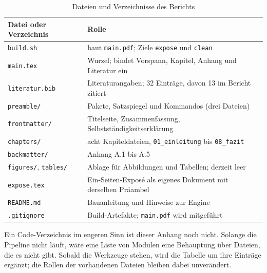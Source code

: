 \begin{table}[ht]
  \centering
  \caption{Dateien und Verzeichnisse des Berichts}
  \label{tab:dateien}
  \small
  \begin{tabular}{@{}>{\raggedright\arraybackslash}p{}>{\raggedright\arraybackslash}p{}@{}}
    \toprule
    Datei oder Verzeichnis & Rolle \\
    \midrule
    \texttt{build.sh} & baut \texttt{main.pdf}; Ziele \texttt{expose} und \texttt{clean} \\
    \texttt{main.tex} & Wurzel; bindet Vorspann, Kapitel, Anhang und Literatur ein \\
    \texttt{literatur.bib} & Literaturangaben; 32 Einträge, davon 13 im Bericht zitiert \\
    \texttt{preamble/} & Pakete, Satzspiegel und Kommandos (drei Dateien) \\
    \texttt{frontmatter/} & Titelseite, Zusammenfassung, Selbstständigkeitserklärung \\
    \texttt{chapters/} & acht Kapiteldateien, \texttt{01\_einleitung} bis \texttt{08\_fazit} \\
    \texttt{backmatter/} & Anhang A.1 bis A.5 \\
    \texttt{figures/}, \texttt{tables/} & Ablage für Abbildungen und Tabellen; derzeit leer \\
    \texttt{expose.tex} & Ein-Seiten-Exposé als eigenes Dokument mit derselben Präambel \\
    \texttt{README.md} & Bauanleitung und Hinweise zur Engine \\
    \texttt{.gitignore} & Build-Artefakte; \texttt{main.pdf} wird mitgeführt \\
    \bottomrule
  \end{tabular}
\end{table}

Ein Code-Verzeichnis im engeren Sinn ist dieser Anhang noch nicht. Solange die Pipeline nicht
läuft, wäre eine Liste von Modulen eine Behauptung über Dateien, die es nicht gibt. Sobald
die Werkzeuge stehen, wird die Tabelle um ihre Einträge ergänzt; die Rollen der vorhandenen
Dateien bleiben dabei unverändert.
